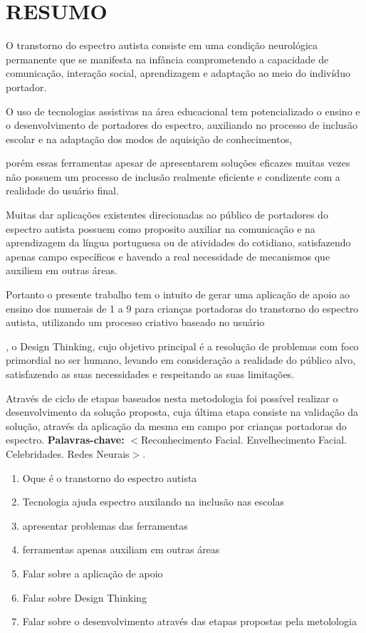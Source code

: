 \section*{\center RESUMO} 
\singlespacing 
O transtorno do espectro autista consiste em uma condição neurológica permanente que se manifesta na infância comprometendo a capacidade de comunicação, interação social, aprendizagem e adaptação ao meio do indivíduo portador. 

O uso de tecnologias assistivas na área educacional tem potencializado o ensino e o desenvolvimento de portadores do espectro, auxiliando no processo de inclusão escolar e na adaptação dos modos de aquisição de conhecimentos, 

porém essas ferramentas apesar de apresentarem soluções eficazes muitas vezes não possuem um processo de inclusão realmente eficiente e condizente com a realidade do usuário final. 

Muitas dar aplicações existentes direcionadas ao público de portadores do espectro autista possuem como proposito auxiliar na comunicação e na aprendizagem da língua portuguesa ou de atividades do cotidiano, satisfazendo apenas campo específicos e havendo a real necessidade de mecanismos que auxiliem em outras áreas.

Portanto o presente trabalho tem o intuito de gerar uma aplicação de apoio ao ensino dos numerais de 1 a 9 para crianças portadoras do transtorno do espectro autista, utilizando um processo criativo baseado no usuário

, o Design Thinking, cujo objetivo principal é a resolução de problemas com foco primordial no ser humano, levando em consideração a realidade do público alvo, satisfazendo as suas necessidades e respeitando as suas limitações.  

Através de ciclo de etapas baseados nesta metodologia foi possível realizar o desenvolvimento da solução proposta, cuja última etapa consiste na validação da solução, através da aplicação da mesma em campo por crianças portadoras do espectro.
\singlespacing 
\noindent\textbf{Palavras-chave:} $<$Reconhecimento Facial. Envelhecimento Facial. Celebridades. Redes Neurais$>$.

\begin{enumerate}
	\item Oque é o transtorno do espectro autista
	\item Tecnologia ajuda espectro auxilando na inclusão nas escolas
	\item apresentar problemas das ferramentas
	\item ferramentas apenas auxiliam em outras áreas
	\item Falar sobre a aplicação de apoio
	\item Falar sobre Design Thinking
	\item Falar sobre o desenvolvimento através das etapas propostas pela metolologia
\end{enumerate}



